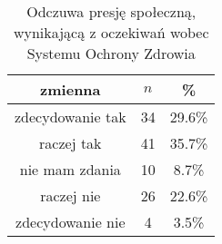 \begin{table}[H]
\caption{Odczuwa presję społeczną, wynikającą z oczekiwań wobec Systemu Ochrony Zdrowia}
\centering
\begin{tabular}{ | c | c | c |}
\hline
zmienna & $n$ & \% \\
\hline
zdecydowanie tak  &  34  & 29.6\% \\
\hline
raczej tak  &  41  & 35.7\% \\
\hline
nie mam zdania  &  10  & 8.7\% \\
\hline
raczej nie  &  26  & 22.6\% \\
\hline
zdecydowanie nie  &  4  & 3.5\% \\
\hline
\end{tabular}
\label{tab:Q15}
\end{table}

